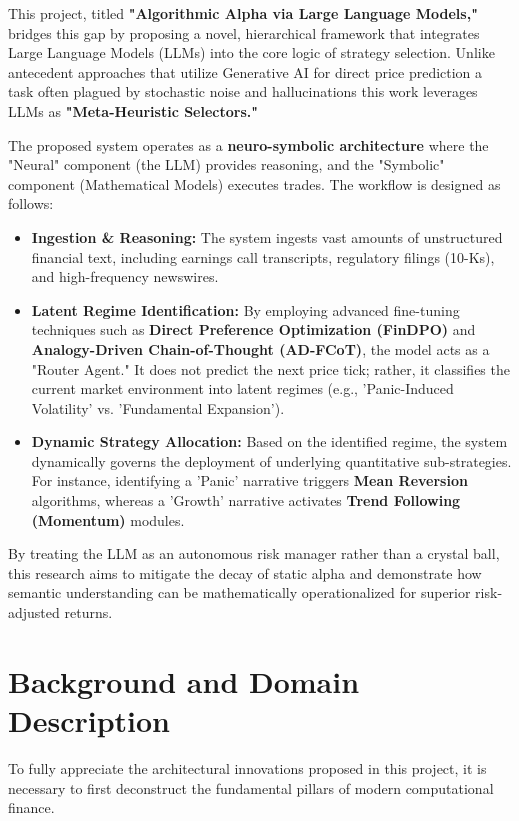 \documentclass[12pt, a4paper]{report}
\begin{document}
This project, titled \textbf{"Algorithmic Alpha via Large Language Models,"} bridges this gap by proposing a novel, hierarchical framework that integrates Large Language Models (LLMs) into the core logic of strategy selection. Unlike antecedent approaches that utilize Generative AI for direct price prediction a task often plagued by stochastic noise and hallucinations this work leverages LLMs as \textbf{"Meta-Heuristic Selectors."}

The proposed system operates as a \textbf{neuro-symbolic architecture} where the "Neural" component (the LLM) provides reasoning, and the "Symbolic" component (Mathematical Models) executes trades. The workflow is designed as follows:

\begin{itemize}
    \item \textbf{Ingestion \& Reasoning:} The system ingests vast amounts of unstructured financial text, including earnings call transcripts, regulatory filings (10-Ks), and high-frequency newswires.
    \item \textbf{Latent Regime Identification:} By employing advanced fine-tuning techniques such as \textbf{Direct Preference Optimization (FinDPO)} and \textbf{Analogy-Driven Chain-of-Thought (AD-FCoT)}, the model acts as a "Router Agent." It does not predict the next price tick; rather, it classifies the current market environment into latent regimes (e.g., 'Panic-Induced Volatility' vs. 'Fundamental Expansion').
    \item \textbf{Dynamic Strategy Allocation:} Based on the identified regime, the system dynamically governs the deployment of underlying quantitative sub-strategies. For instance, identifying a 'Panic' narrative triggers \textbf{Mean Reversion} algorithms, whereas a 'Growth' narrative activates \textbf{Trend Following (Momentum)} modules.
\end{itemize}

By treating the LLM as an autonomous risk manager rather than a crystal ball, this research aims to mitigate the decay of static alpha and demonstrate how semantic understanding can be mathematically operationalized for superior risk-adjusted returns.


\section{Background and Domain Description}
To fully appreciate the architectural innovations proposed in this project, it is necessary to first deconstruct the fundamental pillars of modern computational finance.
\end{document}

